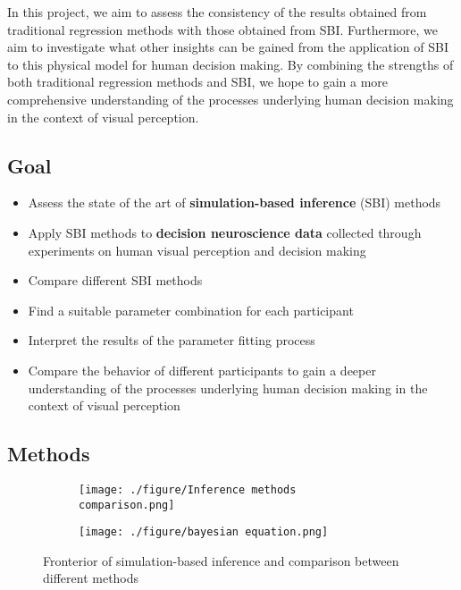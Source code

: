 In this project, we aim to assess the consistency of the results obtained from traditional regression methods with those obtained from SBI. 
Furthermore, we aim to investigate what other insights can be gained from the application of SBI to this physical model for human decision making. 
By combining the strengths of both traditional regression methods and SBI, we hope to gain a more comprehensive understanding of the processes underlying human decision making in the context of visual perception.

\subsection{Goal}

\begin{itemize}
  \item Assess the state of the art of \textbf{simulation-based inference} (SBI) methods
  \item Apply SBI methods to \textbf{decision neuroscience data} collected through experiments on human visual perception and decision making
  \item Compare different SBI methods
  \item Find a suitable parameter combination for each participant
  \item Interpret the results of the parameter fitting process
  \item Compare the behavior of different participants to gain a deeper understanding of the processes underlying human decision making in the context of visual perception
\end{itemize}

\subsection{Methods}

\begin{figure}[!htbp]
  \centering
  \begin{subfigure}{.79\textwidth}
    \centering
    \texttt{[image: ./figure/Inference methods comparison.png]}
  \end{subfigure}
  \begin{subfigure}{.2\textwidth}
	\centering
	\texttt{[image: ./figure/bayesian equation.png]}
  \end{subfigure}
  \caption{Fronterior of simulation-based inference and comparison between different methods}
  \label{fig: inference methods}
\end{figure}

